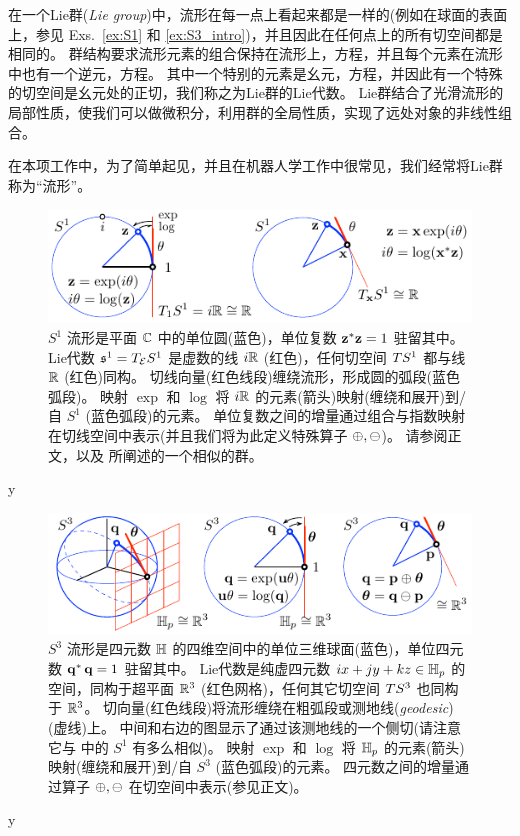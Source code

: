 在一个Lie群(\emph{Lie group})中，流形在每一点上看起来都是一样的(例如在球面的表面上，参见 Exs.~\ref{ex:S1} 和 \ref{ex:S3_intro})，并且因此在任何点上的所有切空间都是相同的。 
群结构要求流形元素的组合保持在流形上，方程，并且每个元素在流形中也有一个逆元，方程。
其中一个特别的元素是幺元，方程，并因此有一个特殊的切空间是幺元处的正切，我们称之为Lie群的Lie代数。
Lie群结合了光滑流形的局部性质，使我们可以做微积分，利用群的全局性质，实现了远处对象的非线性组合。

在本项工作中，为了简单起见，并且在机器人学工作中很常见，我们经常将Lie群称为“流形”。

%
%
\begin{figure}[tb]
\centering
\includegraphics{figures/manifold_z}
\caption{$S^1$ 流形是平面 ${\mathbb C}$ 中的单位圆(蓝色)，单位复数 ${\bf z}^*{\bf z}=1$ 驻留其中。 
Lie代数 $\frak{s}^1=T_{\mathcal{E}}{S^1}$ 是虚数的线 $i{\mathbb R}$ (红色)，任何切空间 $TS^1$ 都与线 ${\mathbb R}$ (红色)同构。
切线向量(红色线段)缠绕流形，形成圆的弧段(蓝色弧段)。
映射 $\exp$ 和 $\log$ 将 $i{\mathbb R}$ 的元素(箭头)映射(缠绕和展开)到/自 $S^1$ (蓝色弧段)的元素。
单位复数之间的增量通过组合与指数映射在切线空间中表示(并且我们将为此定义特殊算子 $\oplus,\ominus$)。
请参阅正文，以及  所阐述的一个相似的群。
}
\label{fig:manifold_z}
\end{figure}
%

\if\examples y

\fi

\begin{figure}[t]
\centering
\includegraphics{figures/manifold_q}
\caption{$S^3$ 流形是四元数 ${\mathbb H}$ 的四维空间中的单位三维球面(蓝色)，单位四元数 ${\bf q}^*\,{\bf q}=1$ 驻留其中。
Lie代数是纯虚四元数 $ix+jy+kz\in{\mathbb H}_p$ 的空间，同构于超平面 ${\mathbb R}^3$ (红色网格)，任何其它切空间 $TS^3$ 也同构于 ${\mathbb R}^3$。
切向量(红色线段)将流形缠绕在粗弧段或测地线(\emph{geodesic})(虚线)上。
中间和右边的图显示了通过该测地线的一个侧切(请注意它与  中的 $S^1$ 有多么相似)。
映射 $\exp$ 和 $\log$ 将 ${\mathbb H}_p$ 的元素(箭头)映射(缠绕和展开)到/自 $S^3$ (蓝色弧段)的元素。
四元数之间的增量通过算子 $\oplus,\ominus$ 在切空间中表示(参见正文)。
}
\label{fig:manifold_q}
\end{figure}
%
\if\examples y

\fi



